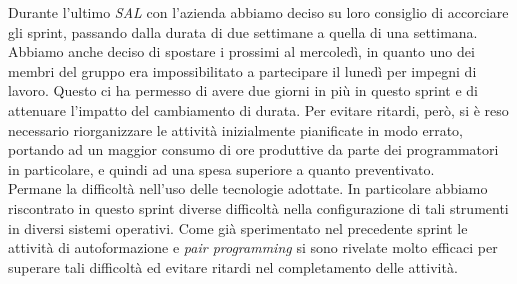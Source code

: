 Durante l'ultimo \textit{SAL} con l'azienda abbiamo deciso su loro consiglio di accorciare gli sprint, passando dalla durata di due settimane a quella di una settimana. Abbiamo anche deciso di spostare i prossimi al mercoledì, in quanto uno dei membri del gruppo era impossibilitato a partecipare il lunedì per impegni di lavoro. Questo ci ha permesso di avere due giorni in più in questo sprint e di attenuare l'impatto del cambiamento di durata. Per evitare ritardi, però, si è reso necessario riorganizzare le attività inizialmente pianificate in modo errato, portando ad un maggior consumo di ore produttive da parte dei programmatori in particolare, e quindi ad una spesa superiore a quanto preventivato. \\
Permane la difficoltà nell'uso delle tecnologie adottate. In particolare abbiamo riscontrato in questo sprint diverse difficoltà nella configurazione di tali strumenti in diversi sistemi operativi. Come già sperimentato nel precedente sprint le attività di autoformazione e \textit{pair programming} si sono rivelate molto efficaci per superare tali difficoltà ed evitare ritardi nel completamento delle attività.

